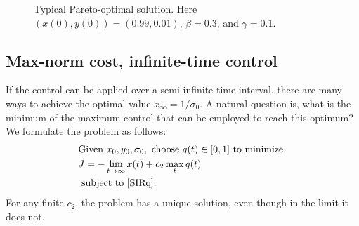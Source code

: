 \documentclass[english,12pt]{article}
\newcommand{\Rnot}{\sigma_0}
\newcommand{\Sinf}{x_\infty}
\begin{document}
\begin{figure}
    \centering
    \caption{Typical Pareto-optimal solution.  Here $(x(0),y(0)) = (0.99,0.01)$, $\beta=0.3$, and $\gamma=0.1$.\label{fig:example1}}
\end{figure}

\subsection{Max-norm cost, infinite-time control}
If the control can be applied over a semi-infinite time interval, there are many ways
to achieve the optimal value $\Sinf = 1/\Rnot$.  A natural question is, what is the
minimum of the maximum control that can be employed to reach this optimum?  We formulate
the problem as follows:
\begin{align} \label{eq:max-inf-problem}
\begin{aligned}
& \text{Given } x_0, y_0, \sigma_0, \text{ choose } q(t) \in [0,1] \text{ to minimize }  \\
&     J = -\lim_{t\to\infty} x(t) + c_2 \max_t q(t) \\
& \text{ subject to } \eqref{SIRq}.
\end{aligned}
\end{align}
For any finite $c_2$, the problem has a unique solution, even though in the limit
it does not.
\end{document}
